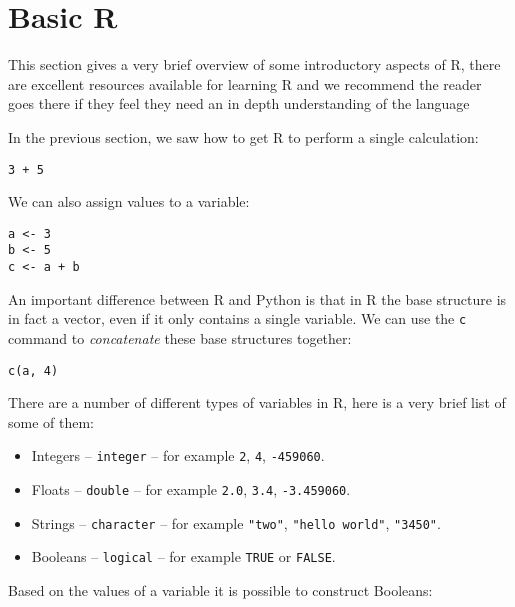 \section{Basic R}\label{sec:basic-R}

This section gives a very brief overview of some introductory aspects of R,
there are excellent resources available for learning R and we recommend the
reader goes there if they feel they need an in depth understanding of the
language %

In the previous section, we saw how to get R to perform a single
calculation:

\begin{verbatim}
3 + 5
\end{verbatim}

We can also assign values to a variable:

\begin{verbatim}
a <- 3
b <- 5
c <- a + b
\end{verbatim}

An important difference between R and Python is that in R the base structure is
in fact a vector, even if it only contains a single variable. We can use the
\texttt{c} command to \textit{concatenate} these base structures
together:

\begin{verbatim}
c(a, 4)
\end{verbatim}

There are a number of different types of variables in R, here is a very
brief list of some of them:

\begin{itemize}
    \item Integers -- \texttt{integer} -- for example \texttt{2},
        \texttt{4}, \texttt{-459060}.
    \item Floats -- \texttt{double} -- for example \texttt{2.0},
        \texttt{3.4}, \texttt{-3.459060}.
    \item Strings -- \texttt{character} -- for example
        \texttt{"two"}, \texttt{"hello world"}, \texttt{"3450"}.
    \item Booleans -- \texttt{logical} -- for example
        \texttt{TRUE} or
        \texttt{FALSE}.
\end{itemize}

Based on the values of a variable it is possible to construct Booleans:


